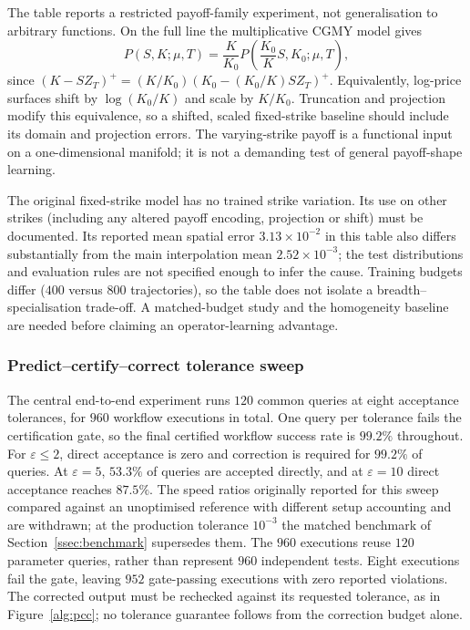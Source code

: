 \documentclass[11pt]{amsart}
\theoremstyle{remark}
\begin{document}
The table reports a restricted payoff-family experiment, not generalisation
to arbitrary functions. On the full line the multiplicative CGMY model gives
\begin{equation}
 P(S,K;\mu,T)=\frac{K}{K_0}
             P\!\left(\frac{K_0}{K}S,K_0;\mu,T\right),
 \label{eq:strike-homogeneity}
\end{equation}
since $(K-SZ_T)^+=(K/K_0)(K_0-(K_0/K)SZ_T)^+$.
Equivalently, log-price surfaces shift by $\log(K_0/K)$ and scale by
$K/K_0$. Truncation and projection modify this equivalence, so a shifted,
scaled fixed-strike baseline should include its domain and projection errors.
The varying-strike payoff is a functional input on a one-dimensional manifold;
it is not a demanding test of general payoff-shape learning.

The original fixed-strike model has no trained strike variation. Its use on
other strikes (including any altered payoff encoding, projection or shift)
must be documented. Its reported mean spatial error $3.13\times10^{-2}$ in
this table also differs substantially from the main interpolation mean
$2.52\times10^{-3}$; the test distributions and evaluation rules are not
specified enough to infer the cause. Training budgets differ ($400$ versus
$800$ trajectories), so the table does not isolate a breadth--specialisation
trade-off. A matched-budget study and the homogeneity baseline are needed
before claiming an operator-learning advantage.

\subsubsection{Predict--certify--correct tolerance sweep}
\label{ssec:tolerance-results}

The central end-to-end experiment runs $120$ common queries at eight
acceptance tolerances, for $960$ workflow executions in total.  One query per
tolerance fails the certification gate, so the final certified workflow
success rate is $99.2\%$ throughout.  For $\varepsilon\le2$, direct
acceptance is zero and correction is required for $99.2\%$ of queries.
At $\varepsilon=5$, $53.3\%$ of queries are accepted directly, and at
$\varepsilon=10$ direct acceptance reaches $87.5\%$. The speed ratios
originally reported for this sweep compared against an unoptimised
reference with different setup accounting and are withdrawn; at the
production tolerance $10^{-3}$ the matched benchmark of
Section~\ref{ssec:benchmark} supersedes them.  The $960$ executions reuse $120$ parameter queries, rather than represent
$960$ independent tests. Eight executions fail the gate, leaving $952$
gate-passing executions with zero reported violations. The corrected output
must be rechecked against its requested tolerance, as in
Figure~\ref{alg:pcc}; no tolerance guarantee follows from the correction
budget alone.
\end{document}
